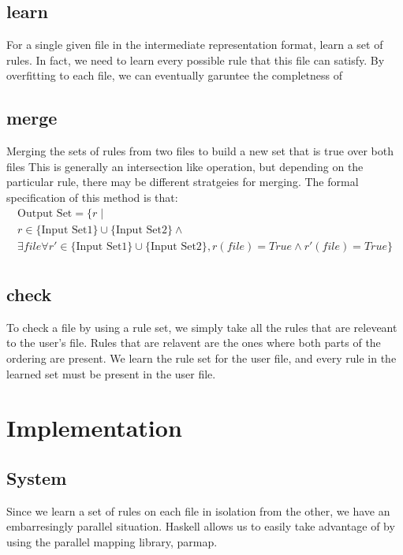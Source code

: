 \subsection{learn}
  For a single given file in the intermediate representation format, learn a set of rules.
  In fact, we need to learn every possible rule that this file can satisfy.
  By overfitting to each file, we can eventually garuntee the completness of \app

\subsection{merge}
  Merging the sets of rules from two files to build a new set that is true over both files
  This is generally an intersection like operation, but depending on the particular rule, there may be different stratgeies for merging.
  The formal specification of this method is that:
  \begin{multline*}
  \text{Output Set} = \{r \mid \\
    r \in \text{\{Input Set1\}} \cup \text{\{Input Set2\}} \land \\
    \exists file \forall r' \in \text{\{Input Set1\}} \cup \text{\{Input Set2\}}, r(file) = True \land r'(file) = True \} \\
  \end{multline*}

\subsection{check}
  To check a file by using a rule set, we simply take all the rules that are releveant to the user's file.
  Rules that are relavent are the ones where both parts of the ordering are present.
  We learn the rule set for the user file, and every rule in the learned set must be present in the user file.

\section{Implementation}

\subsection{System}
Since we learn a set of rules on each file in isolation from the other, we have an embarresingly parallel situation.
Haskell allows us to easily take advantage of by using the parallel mapping library, parmap.

